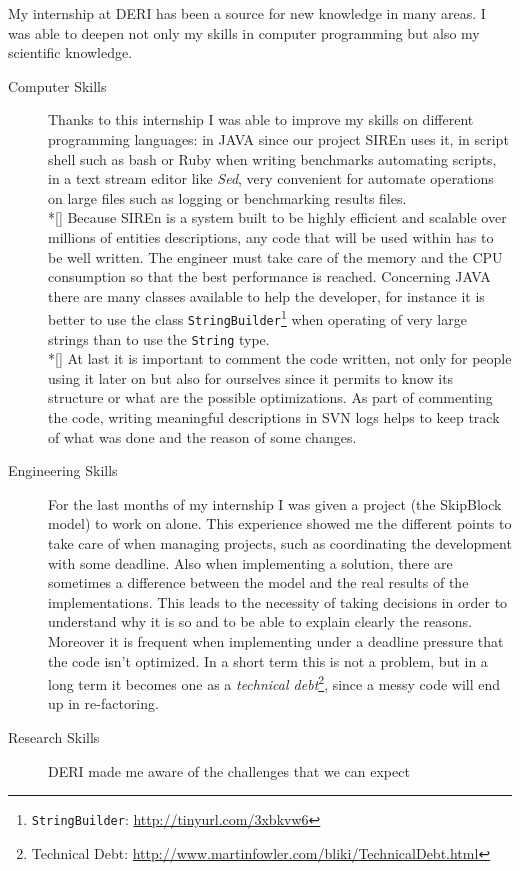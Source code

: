 My internship at DERI has been a source for new knowledge in many areas. I was
able to deepen not only my skills in computer programming but also my
scientific knowledge.
\begin{description}
\item[Computer Skills] Thanks to this internship I was able to improve my
skills on different programming languages: in JAVA since our project SIREn
uses it, in script shell such as bash or Ruby when writing benchmarks automating
scripts, in a text stream editor like \emph{Sed}, very convenient for automate
operations on large files such as logging or benchmarking results files.
\\*[\parskip]
Because SIREn is a system built to be highly efficient and scalable over
millions of entities descriptions, any code that will be used within has to be
well written. The engineer must take care of the memory and the CPU consumption
so that the best performance is reached. Concerning JAVA there are many classes
available to help the developer, for instance it is better to use the class
\texttt{StringBuilder}\footnote{\texttt{StringBuilder}:
\url{http://tinyurl.com/3xbkvw6}} when operating of very large strings than to
use the \texttt{String} type.
\\*[\parskip]
At last it is important to comment the code written, not only for people using
it later on but also for ourselves since it permits to know its structure or
what are the possible optimizations. As part of commenting the code, writing
meaningful descriptions in SVN logs helps to keep track of what was done and
the reason of some changes.
\item[Engineering Skills] For the last months of my internship I was given a
project (the SkipBlock model) to work on alone. This experience showed me the
different points to take care of when managing projects, such as coordinating
the development with some deadline. Also when implementing a solution, there
are sometimes a difference between the model and the real results of the
implementations. This leads to the necessity of taking decisions in order to
understand why it is so and to be able to explain clearly the reasons. Moreover
it is frequent when implementing under a deadline pressure that the code isn't
optimized. In a short term this is not a problem, but in a long term it becomes
one as a \emph{technical debt}\footnote{Technical Debt:
\url{http://www.martinfowler.com/bliki/TechnicalDebt.html}}, since a messy code
will end up in re-factoring.
\item[Research Skills] DERI made me aware of the challenges that we can expect

\end{description}
